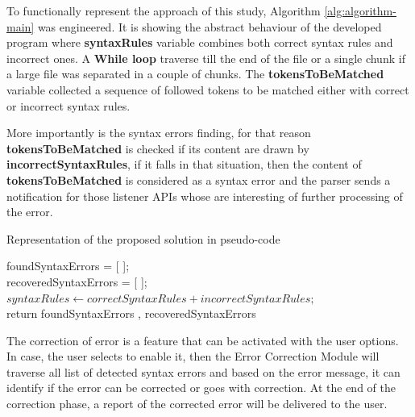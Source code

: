To functionally represent the approach of this study, Algorithm \ref{alg:algorithm-main} was engineered. It is showing the abstract behaviour of the developed program where \textbf{syntaxRules} variable combines both correct syntax rules and incorrect ones. A \textbf{While loop} traverse till the end of the file or a single chunk if a large file was separated in a couple of chunks. The \textbf{tokensToBeMatched}  variable collected a sequence of followed tokens to be matched either with correct or incorrect syntax rules.

More importantly is the syntax errors finding, for that reason \textbf{tokensToBeMatched} is checked if its content are drawn by \textbf{incorrectSyntaxRules}, if it falls in that situation, then the content of \textbf{tokensToBeMatched} is considered as a syntax error and the parser sends a notification for those listener APIs  whose are interesting of further processing of the error. 

\begin{algorithm}[] 
 \caption{Representation of the proposed solution  in pseudo-code}
 \label{alg:algorithm-main}

foundSyntaxErrors = [ ];\\
recoveredSyntaxErrors = [ ];\\
$syntaxRules \leftarrow correctSyntaxRules + incorrectSyntaxRules;$\\
return foundSyntaxErrors , recoveredSyntaxErrors
\end{algorithm}

The correction of error is a feature that can be activated with the user options. In case, the user selects to enable it, then the Error Correction Module will traverse all list of detected syntax errors and based on the error message, it can identify if the error can be corrected or goes with correction. At the end of the correction phase, a report of the corrected error will be delivered to the user. 

